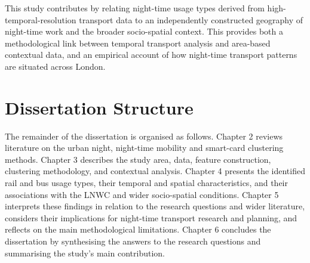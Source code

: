 This study contributes by relating night-time usage types derived from high-temporal-resolution transport data to an independently constructed geography of night-time work and the broader socio-spatial context. This provides both a methodological link between temporal transport analysis and area-based contextual data, and an empirical account of how night-time transport patterns are situated across London.

\section{Dissertation Structure}

The remainder of the dissertation is organised as follows. Chapter 2 reviews literature on the urban night, night-time mobility and smart-card clustering methods. Chapter 3 describes the study area, data, feature construction, clustering methodology, and contextual analysis. Chapter 4 presents the identified rail and bus usage types, their temporal and spatial characteristics, and their associations with the LNWC and wider socio-spatial conditions. Chapter 5 interprets these findings in relation to the research questions and wider literature, considers their implications for night-time transport research and planning, and reflects on the main methodological limitations. Chapter 6 concludes the dissertation by synthesising the answers to the research questions and summarising the study's main contribution.
